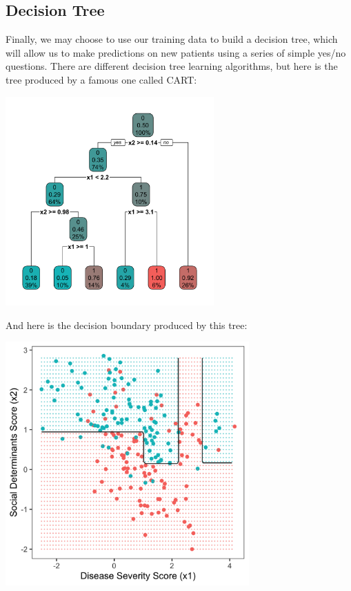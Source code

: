 \subsection{Decision Tree \label{ssect:class_decision_tree}}

Finally, we may choose to use our training data to build a decision tree, which will allow us to make predictions on new patients using a series of simple yes/no questions. There are different decision tree learning algorithms, but here is the tree produced by a famous one called CART:
\begin{center}
\includegraphics[width=0.6\textwidth]{img/esl-decision-tree-just-tree.png}
\end{center}
And here is the decision boundary produced by this tree:
\begin{center}
\includegraphics[width=0.7\textwidth]{img/esl-decision-tree.png}
\end{center}

